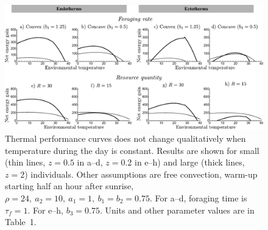 \documentclass[11pt]{article}
\begin{document}
\begin{figure}
    \includegraphics[width=\textwidth]{figS2}
		\caption{
			\setstretch{\stretchby}
			Thermal performance curves does not change qualitatively when temperature during the day is constant.
			Results are shown for small (thin lines, $z = 0.5$ in a--d, $z = 0.2$ in e--h) and large (thick lines, $z = 2$) individuals.
			Other assumptions are free convection, warm-up starting half an hour after sunrise, $\rho = 24,\ a_2 = 10, \ a_1 = 1, \ b_1 = b_2 = 0.75 $.
	    For a--d, foraging time is $\tau_f = 1$.
	    For e--h, $b_3 = 0.75$.
	    Units and other parameter values are in Table~1.
		}
	\label{fig:therm}
\end{figure}



\end{document}
